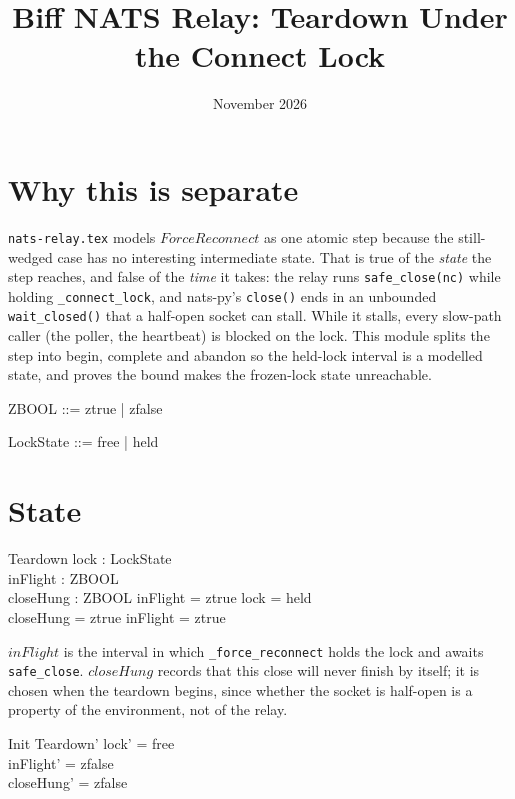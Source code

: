 \documentclass[a4paper,10pt,fleqn]{article}
\begin{document}
\title{Biff NATS Relay: Teardown Under the Connect Lock}
\date{November 2026}
\maketitle

\section{Why this is separate}

\texttt{nats-relay.tex} models $ForceReconnect$ as one atomic step because
the still-wedged case has no interesting intermediate state.  That is true
of the \emph{state} the step reaches, and false of the \emph{time} it takes:
the relay runs \texttt{safe\_close(nc)} while holding \texttt{\_connect\_lock},
and nats-py's \texttt{close()} ends in an unbounded \texttt{wait\_closed()}
that a half-open socket can stall.  While it stalls, every slow-path caller
(the poller, the heartbeat) is blocked on the lock.  This module splits the
step into begin, complete and abandon so the held-lock interval is a
modelled state, and proves the bound makes the frozen-lock state
unreachable.

\begin{zed}
  ZBOOL ::= ztrue | zfalse
\end{zed}

\begin{zed}
  LockState ::= free | held
\end{zed}

\section{State}

\begin{schema}{Teardown}
  lock : LockState \\
  inFlight : ZBOOL \\
  closeHung : ZBOOL
  \where
  inFlight = ztrue \implies lock = held \\
  closeHung = ztrue \implies inFlight = ztrue
\end{schema}

$inFlight$ is the interval in which \texttt{\_force\_reconnect} holds the
lock and awaits \texttt{safe\_close}.  $closeHung$ records that this close
will never finish by itself; it is chosen when the teardown begins, since
whether the socket is half-open is a property of the environment, not of the
relay.

\begin{schema}{Init}
  Teardown'
  \where
  lock' = free \\
  inFlight' = zfalse \\
  closeHung' = zfalse
\end{schema}
\end{document}
